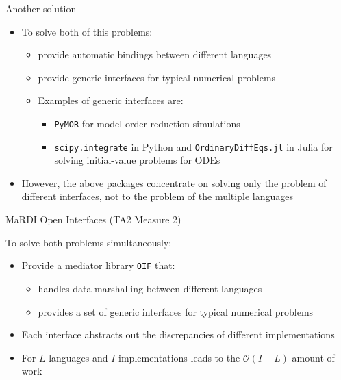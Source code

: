 \documentclass[10pt, aspectratio=169, progressbar=frametitle]{beamer}
\begin{document}
\begin{frame}{Another solution}
  \begin{itemize}
    \item To solve both of this problems:
          \begin{itemize}
            \item provide automatic bindings between different languages
            \item provide generic interfaces for typical numerical problems
            \item Examples of generic interfaces are:
                  \begin{itemize}
                    \item \texttt{PyMOR} for model-order reduction simulations
                    \item  \texttt{scipy.integrate} in Python
                          and \texttt{OrdinaryDiffEqs.jl} in Julia for solving initial-value problems for ODEs
                  \end{itemize}
          \end{itemize}
    \item However, the above packages concentrate on solving only
          the problem of different interfaces, not to the problem
          of the multiple languages
  \end{itemize}
\end{frame}

\begin{frame}{MaRDI Open Interfaces (TA2 Measure 2)}
  \begin{minipage}{0.45\textwidth}
    To solve both problems simultaneously:
    \begin{itemize}
      \item Provide a mediator library \texttt{OIF} that:
            \begin{itemize}
              \item handles data marshalling between different languages
              \item provides a set of generic interfaces
                    for typical numerical problems
            \end{itemize}
      \item Each interface abstracts out the discrepancies
            of different implementations
      \item For $L$ languages and $I$ implementations leads to
            the $\mathcal O (I + L)$ amount of work
    \end{itemize}
  \end{minipage}\hfill%
  \begin{minipage}{0.50\textwidth}
    
  \end{minipage}
\end{frame}
\end{document}
